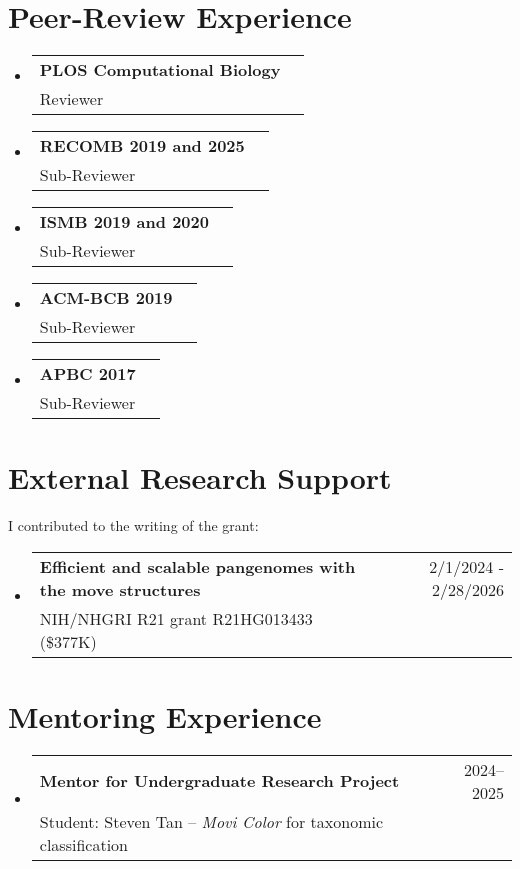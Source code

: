 \documentclass[A4,11pt]{article}
\makeatletter
\newcommand{\CVSubheading}[4]{
  \vspace{-2pt}\item
    \begin{tabular*}{0.97\textwidth}[t]{l@{\extracolsep{\fill}}r}
      \textbf{#1} & #2 \\
      \small#3 & \small #4 \\
    \end{tabular*}\vspace{-7pt}
}
\newcommand{\CVSubHeadingListStart}{\begin{itemize}[leftmargin=0.5cm, label={}]}
\newcommand{\CVSubHeadingListEnd}{\end{itemize}}
\makeatother
\begin{document}

\section{Peer-Review Experience}
\CVSubHeadingListStart
\CVSubheading {PLOS Computational Biology}{}{Reviewer}{}
\CVSubheading {RECOMB 2019 and 2025}{}{Sub-Reviewer}{}
\CVSubheading {ISMB 2019 and 2020}{}{Sub-Reviewer}{}
\CVSubheading {ACM-BCB 2019}{}{Sub-Reviewer}{}
\CVSubheading {APBC 2017}{}{Sub-Reviewer}{}
\CVSubHeadingListEnd

\section{External Research Support}
  I contributed to the writing of the grant:\\
  \CVSubHeadingListStart
  \CVSubheading
  {Efficient and scalable pangenomes with the move structures} {2/1/2024 - 2/28/2026}
  {NIH/NHGRI R21 grant R21HG013433 (\$377K)}{}
  \CVSubHeadingListEnd

\section{Mentoring Experience}
\CVSubHeadingListStart
  \CVSubheading
    {Mentor for Undergraduate Research Project}{2024--2025}
    {Student: Steven Tan -- \textit{Movi Color} for taxonomic classification}{}
\CVSubHeadingListEnd
\end{document}
